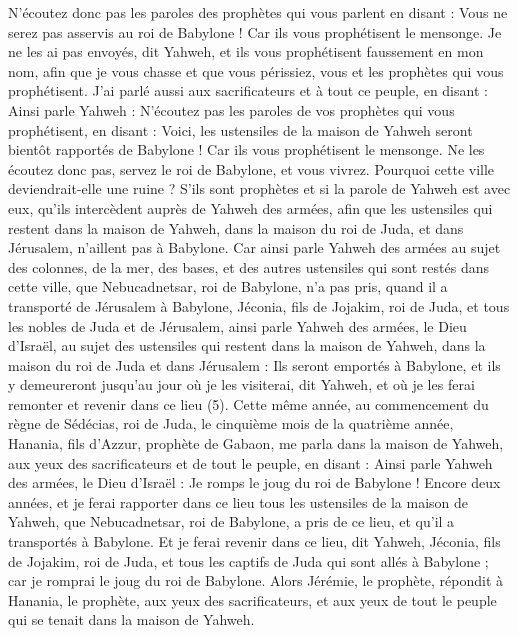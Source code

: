 \begin{multicols}{2}
N'écoutez donc pas les paroles des prophètes qui vous parlent en disant : Vous ne serez pas asservis au roi de Babylone ! Car ils vous prophétisent le mensonge.
Je ne les ai pas envoyés, dit Yahweh, et ils vous prophétisent faussement en mon nom, afin que je vous chasse et que vous périssiez, vous et les prophètes qui vous prophétisent.
J’ai parlé aussi aux sacrificateurs et à tout ce peuple, en disant : Ainsi parle Yahweh : N'écoutez pas les paroles de vos prophètes qui vous prophétisent, en disant : Voici, les ustensiles de la maison de Yahweh seront bientôt rapportés de Babylone ! Car ils vous prophétisent le mensonge.
Ne les écoutez donc pas, servez le roi de Babylone, et vous vivrez. Pourquoi cette ville deviendrait-elle une ruine ?
S'ils sont prophètes et si la parole de Yahweh est avec eux, qu'ils intercèdent auprès de Yahweh des armées, afin que les ustensiles qui restent dans la maison de Yahweh, dans la maison du roi de Juda, et dans Jérusalem, n'aillent pas à Babylone.
Car ainsi parle Yahweh des armées au sujet des colonnes, de la mer, des bases, et des autres ustensiles qui sont restés dans cette ville,
que Nebucadnetsar, roi de Babylone, n'a pas pris, quand il a transporté de Jérusalem à Babylone, Jéconia, fils de Jojakim, roi de Juda, et tous les nobles de Juda et de Jérusalem,
ainsi parle Yahweh des armées, le Dieu d'Israël, au sujet des ustensiles qui restent dans la maison de Yahweh, dans la maison du roi de Juda et dans Jérusalem :
Ils seront emportés à Babylone, et ils y demeureront jusqu’au jour où je les visiterai, dit Yahweh, et où je les ferai remonter et revenir dans ce lieu\FTNT{} (5).
\VerseOne{}Cette même année, au commencement du règne de Sédécias, roi de Juda, le cinquième mois de la quatrième année, Hanania, fils d’Azzur, prophète de Gabaon, me parla dans la maison de Yahweh, aux yeux des sacrificateurs et de tout le peuple, en disant :
Ainsi parle Yahweh des armées, le Dieu d'Israël : Je romps le joug du roi de Babylone !
Encore deux années, et je ferai rapporter dans ce lieu tous les ustensiles de la maison de Yahweh, que Nebucadnetsar, roi de Babylone, a pris de ce lieu, et qu’il a transportés à Babylone.
Et je ferai revenir dans ce lieu, dit Yahweh, Jéconia, fils de Jojakim, roi de Juda, et tous les captifs de Juda qui sont allés à Babylone ; car je romprai le joug du roi de Babylone.
Alors Jérémie, le prophète, répondit à Hanania, le prophète, aux yeux des sacrificateurs, et aux yeux de tout le peuple qui se tenait dans la maison de Yahweh.

\end{multicols}
